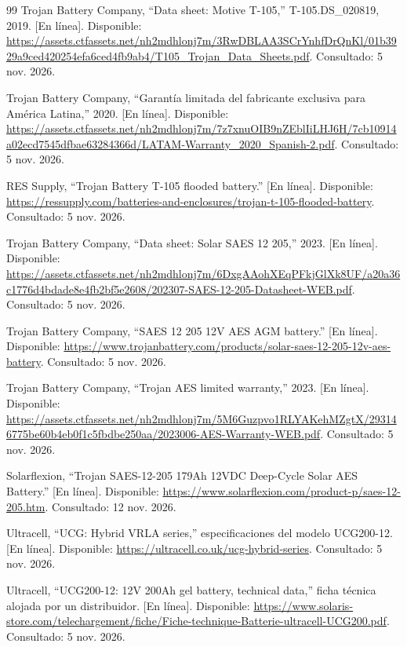 \documentclass[conference]{IEEEtran}
\begin{document}
\begin{thebibliography}{99}
 Trojan Battery Company, ``Data sheet: Motive T-105,'' T-105.DS\_020819, 2019. [En línea]. Disponible: \url{https://assets.ctfassets.net/nh2mdhlonj7m/3RwDBLAA3SCrYnhfDrQnKl/01b3929a9ced420254efa6ced4fb9ab4/T105_Trojan_Data_Sheets.pdf}. Consultado: 5 nov. 2026.

 Trojan Battery Company, ``Garantía limitada del fabricante exclusiva para América Latina,'' 2020. [En línea]. Disponible: \url{https://assets.ctfassets.net/nh2mdhlonj7m/7z7xnuOIB9nZEblIiLHJ6H/7cb10914a02ecd7545dfbae63284366d/LATAM-Warranty_2020_Spanish-2.pdf}. Consultado: 5 nov. 2026.

 RES Supply, ``Trojan Battery T-105 flooded battery.'' [En línea]. Disponible: \url{https://ressupply.com/batteries-and-enclosures/trojan-t-105-flooded-battery}. Consultado: 5 nov. 2026.

 Trojan Battery Company, ``Data sheet: Solar SAES 12 205,'' 2023. [En línea]. Disponible: \url{https://assets.ctfassets.net/nh2mdhlonj7m/6DxgAAohXEqPFkjGlXk8UF/a20a36c1776d4bdade8e4fb2bf5e2608/202307-SAES-12-205-Datasheet-WEB.pdf}. Consultado: 5 nov. 2026.

 Trojan Battery Company, ``SAES 12 205 12V AES AGM battery.'' [En línea]. Disponible: \url{https://www.trojanbattery.com/products/solar-saes-12-205-12v-aes-battery}. Consultado: 5 nov. 2026.

 Trojan Battery Company, ``Trojan AES limited warranty,'' 2023. [En línea]. Disponible: \url{https://assets.ctfassets.net/nh2mdhlonj7m/5M6Guzpvo1RLYAKehMZgtX/293146775be60b4eb0f1c5fbdbe250aa/2023006-AES-Warranty-WEB.pdf}. Consultado: 5 nov. 2026.

 Solarflexion, ``Trojan SAES-12-205 179Ah 12VDC Deep-Cycle Solar AES Battery.'' [En línea]. Disponible: \url{https://www.solarflexion.com/product-p/saes-12-205.htm}. Consultado: 12 nov. 2026.

 Ultracell, ``UCG: Hybrid VRLA series,'' especificaciones del modelo UCG200-12. [En línea]. Disponible: \url{https://ultracell.co.uk/ucg-hybrid-series}. Consultado: 5 nov. 2026.

 Ultracell, ``UCG200-12: 12V 200Ah gel battery, technical data,'' ficha técnica alojada por un distribuidor. [En línea]. Disponible: \url{https://www.solaris-store.com/telechargement/fiche/Fiche-technique-Batterie-ultracell-UCG200.pdf}. Consultado: 5 nov. 2026.


\end{thebibliography}
\end{document}
